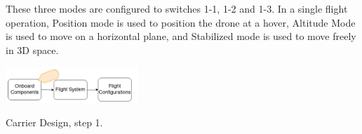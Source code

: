 These three modes are configured to switches 1-1, 1-2 and 1-3. In a single flight operation, Position mode is used to position the drone at a hover, Altitude Mode is used to move on a horizontal plane, and Stabilized mode is used to move freely in 3D space.







\pagebreak

\begin{marginfigure}%
  \vspace{1cm}
  \includegraphics[width=5cm]{images/stage_system/drone_setup/components_order1.png}
  \caption{ Carrier Design, step 1.}
\end{marginfigure}


